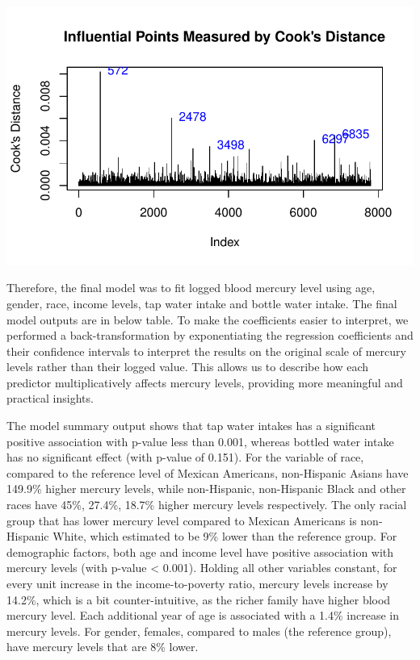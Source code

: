 \documentclass[
  letterpaper,
  DIV=11,
  numbers=noendperiod]{scrartcl}
\begin{document}
\includegraphics{_IDS702_Final_Report_Feedback_files/figure-pdf/unnamed-chunk-16-1.pdf}

Therefore, the final model was to fit logged blood mercury level using
age, gender, race, income levels, tap water intake and bottle water
intake. The final model outputs are in below table. To make the
coefficients easier to interpret, we performed a back-transformation by
exponentiating the regression coefficients and their confidence
intervals to interpret the results on the original scale of mercury
levels rather than their logged value. This allows us to describe how
each predictor multiplicatively affects mercury levels, providing more
meaningful and practical insights.

The model summary output shows that tap water intakes has a significant
positive association with p-value less than 0.001, whereas bottled water
intake has no significant effect (with p-value of 0.151). For the
variable of race, compared to the reference level of Mexican Americans,
non-Hispanic Asians have 149.9\% higher mercury levels, while
non-Hispanic, non-Hispanic Black and other races have 45\%, 27.4\%,
18.7\% higher mercury levels respectively. The only racial group that
has lower mercury level compared to Mexican Americans is non-Hispanic
White, which estimated to be 9\% lower than the reference group. For
demographic factors, both age and income level have positive association
with mercury levels (with p-value \textless{} 0.001). Holding all other
variables constant, for every unit increase in the income-to-poverty
ratio, mercury levels increase by 14.2\%, which is a bit
counter-intuitive, as the richer family have higher blood mercury level.
Each additional year of age is associated with a 1.4\% increase in
mercury levels. For gender, females, compared to males (the reference
group), have mercury levels that are 8\% lower.
\end{document}
